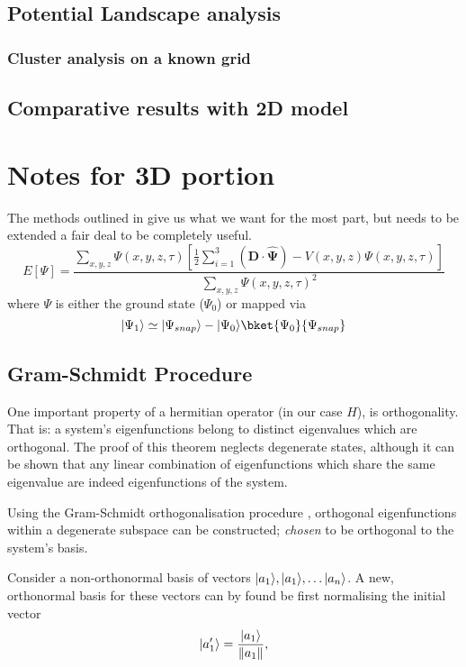 \subsection{Potential Landscape analysis}
\subsubsection{Cluster analysis on a known grid}
\subsection{Comparative results with 2D model}

\section{Notes for 3D portion}
The methods outlined in \cite{Strickland2010} give us what we want for the most part, but needs to be extended a fair deal to be completely useful.
\begin{equation}
E[\Psi] = \frac{\sum_{x,y,z}\Psi(x,y,z,\tau)\left[\frac{1}{2}\sum_{i=1}^3\left(\mathbf{D\cdot\widehat{\Psi}}\right)-V(x,y,z)\Psi(x,y,z,\tau)\right]}{\sum_{x,y,z}\Psi(x,y,z,\tau)^2}
\end{equation}
where $\Psi$ is either the ground state ($\Psi_0$) or mapped via
\begin{equation}
 \ket{\Psi_1} \simeq \ket{\Psi_{snap}} - \ket{\Psi_0}\bket{\Psi_0}{\Psi_{snap}}
\end{equation}

\subsection{Gram-Schmidt Procedure}

One important property of a hermitian operator (in our case $H$), is orthogonality. That is: a system's eigenfunctions belong to distinct eigenvalues which are orthogonal.
The proof of this theorem neglects degenerate states, although it can be shown that any linear combination of eigenfunctions which share the same eigenvalue are indeed eigenfunctions of the system.

Using the Gram-Schmidt orthogonalisation procedure \cite{Gram1883, Schmidt1907}, orthogonal eigenfunctions within a degenerate subspace can be constructed; \emph{chosen} to be orthogonal to the system's basis.

Consider a non-orthonormal basis of vectors $\lvert a_1\rangle, \lvert a_1\rangle, \ldots \lvert a_n\rangle$.
A new, orthonormal basis for these vectors can by found be first normalising the initial vector
\begin{equation}
\lvert a^\prime_1\rangle = \frac{\lvert a_1\rangle}{\lVert a_1\rVert},
\end{equation}

